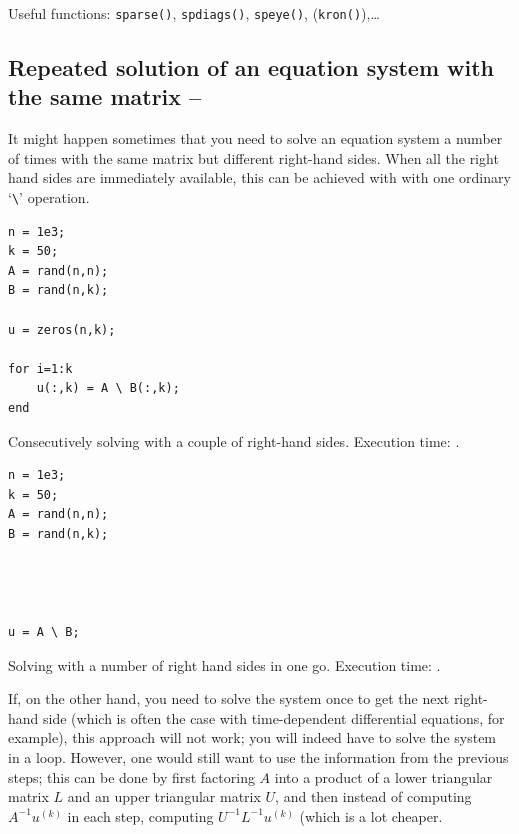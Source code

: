 
\Pointinghand\hspace{1em} Useful functions: \lstinline!sparse()!, \lstinline!spdiags()!, \lstinline!speye()!, (\lstinline!kron()!),\dots



\subsection{Repeated solution of an equation system with the same matrix -- \fastsymbol\fastsymbol\fastsymbol\fastsymbol\fastsymbol}

It might happen sometimes that you need to solve an equation system a number of
times with the same matrix but different right-hand sides. When all the right
hand sides are immediately available, this can be achieved with with one
ordinary `\lstinline!\!' operation.

\hfill
\begin{minipage}[t]{.45\textwidth}
\begin{lstlisting}[framerule=2pt,rulecolor=\color{badred}]
n = 1e3;
k = 50;
A = rand(n,n);
B = rand(n,k);

u = zeros(n,k);

for i=1:k
    u(:,k) = A \ B(:,k);
end
\end{lstlisting}
Consecutively solving with a couple of right-hand sides. Execution time:
.
\end{minipage}
\hfill
\begin{minipage}[t]{.45\textwidth}
\begin{lstlisting}[framerule=2pt,rulecolor=\color{goodgreen}]
n = 1e3;
k = 50;
A = rand(n,n);
B = rand(n,k);




u = A \ B;

\end{lstlisting}
Solving with a number of right hand sides in one go. Execution time:
.
\end{minipage}
\hfill


If, on the other hand, you need to solve the system once to get the next
right-hand side (which is often the case with time-dependent differential
equations, for example), this approach will not work; you will indeed have to
solve the system in a loop. However, one would still want to use the
information from the previous steps; this can be done by first factoring $A$
into a product of a lower triangular matrix $L$ and an upper triangular matrix
$U$, and then instead of computing $A^{-1}u^{(k)}$ in each step, computing
$U^{-1}L^{-1}u^{(k)}$ (which is a lot cheaper.


